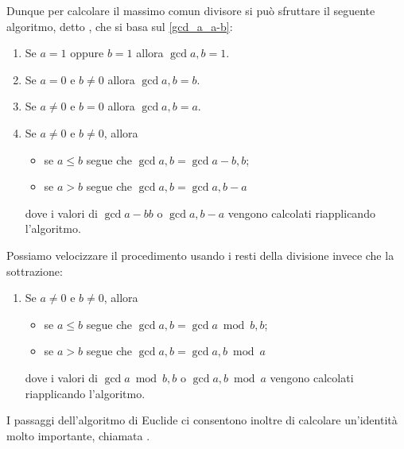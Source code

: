Dunque per calcolare il massimo comun divisore si può sfruttare il seguente algoritmo, detto , che si basa sul \autoref{gcd_a_a-b}:
\begin{enumerate}
    \item Se $a = 1$ oppure $b = 1$ allora $\gcd{a, b} = 1$.
    \item Se $a = 0$ e $b \neq 0$ allora $\gcd{a, b} = b$.
    \item Se $a \neq 0$ e $b = 0$ allora $\gcd{a, b} = a$.
    \item Se $a \neq 0$ e $b \neq 0$, allora
        \begin{itemize}
            \item se $a \leq b$ segue che $\gcd{a, b} = \gcd{a - b, b}$;
            \item se $a > b$ segue che $\gcd{a, b} = \gcd{a, b - a}$
        \end{itemize}
        dove i valori di $\gcd{a - b}{b}$ o $\gcd{a, b - a}$ vengono calcolati riapplicando l'algoritmo.
\end{enumerate}
Possiamo velocizzare il procedimento usando i resti della divisione invece che la sottrazione:
\begin{enumerate}[start=4]
    \item Se $a \neq 0$ e $b \neq 0$, allora
    \begin{itemize}
        \item se $a \leq b$ segue che $\gcd{a, b} = \gcd{a \bmod b, b}$;
        \item se $a > b$ segue che $\gcd{a, b} = \gcd{a, b \bmod a}$
    \end{itemize}
    dove i valori di $\gcd{a \bmod b, b}$ o $\gcd{a, b \bmod a}$ vengono calcolati riapplicando l'algoritmo.
\end{enumerate}

I passaggi dell'algoritmo di Euclide ci consentono inoltre di calcolare un'identità molto importante, chiamata .

